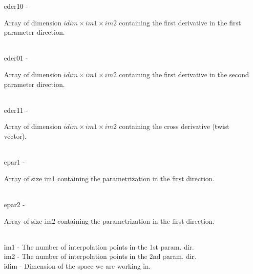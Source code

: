         \>\>    {\fov eder10} \> - \>
        \begin{minipg2}
          Array of dimension $idim\times im1\times im2$ containing the
          first derivative in the first parameter direction.
        \end{minipg2}\\[0.8ex]
        \>\>    {\fov eder01} \> - \>
        \begin{minipg2}
          Array of dimension $idim\times im1\times im2$ containing the
          first derivative in the second parameter direction.
        \end{minipg2}\\[0.8ex]
        \>\>    {\fov eder11} \> - \>
        \begin{minipg2}
          Array of dimension $idim\times im1\times im2$ containing
          the cross derivative (twist vector).
        \end{minipg2}\\[0.8ex]
        \>\>    {\fov epar1} \> - \>
        \begin{minipg2}
          Array of size {\fov im1} containing the
          parametrization in the first direction.
        \end{minipg2}\\[0.8ex]
        \>\>    {\fov epar2} \> - \>
        \begin{minipg2}
          Array of size {\fov im2} containing the
          parametrization in the first direction.
        \end{minipg2}\\[0.8ex]
        \>\>    {\fov im1} \> - \>
          The number of interpolation points in the 1st param. dir.\\
        \>\>    {\fov im2} \> - \>
          The number of interpolation points in the 2nd param. dir.\\
        \>\>    {\fov idim} \> - \> Dimension of the space we are working in.\\
\\

